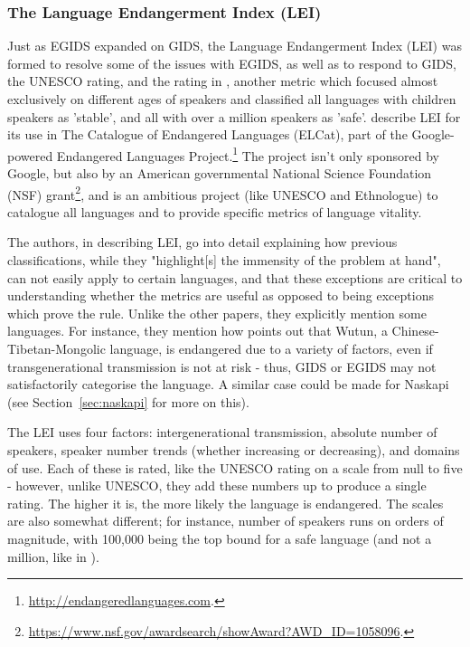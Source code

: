\subsubsection{The Language Endangerment Index (LEI)}

Just as EGIDS expanded on GIDS, the Language Endangerment Index (LEI) was formed to resolve some of the issues with EGIDS, as well as to respond to GIDS, the UNESCO rating, and the rating in \citet{krauss2007classification}, another metric which focused almost exclusively on different ages of speakers and classified all languages with children speakers as 'stable', and all with over a million speakers as 'safe'. \citet{lee2016assessing} describe LEI for its use in The Catalogue of Endangered Languages (ELCat), part of the Google-powered Endangered Languages Project.\footnote{\href{http://endangeredlanguages.com}{http://endangeredlanguages.com}. } The project isn't only sponsored by Google, but also by an American governmental National Science Foundation (NSF) grant\footnote{\href{https://www.nsf.gov/awardsearch/showAward?AWD\_ID=1058096}{https://www.nsf.gov/awardsearch/showAward?AWD\_ID=1058096}. }, and is an ambitious project (like UNESCO and Ethnologue) to catalogue all languages and to provide specific metrics of language vitality.

The authors, in describing LEI, go into detail explaining how previous classifications, while they "highlight[s] the immensity of the problem at hand", can not easily apply to certain languages, and that these exceptions are critical to understanding whether the metrics are useful as opposed to being exceptions which prove the rule. Unlike the other papers, they explicitly mention some languages. For instance, they mention how \citet{dwyer2012tools} points out that Wutun, a Chinese-Tibetan-Mongolic language, is endangered due to a variety of factors, even if transgenerational transmission is not at risk - thus, GIDS or EGIDS may not satisfactorily categorise the language. A similar case could be made for Naskapi (see Section~\ref{sec:naskapi} for more on this).

The LEI uses four factors: intergenerational transmission, absolute number of speakers, speaker number trends (whether increasing or decreasing), and domains of use. Each of these is rated, like the UNESCO rating on a scale from null to five - however, unlike UNESCO, they add these numbers up to produce a single rating. The higher it is, the more likely the language is endangered. The scales are also somewhat different; for instance, number of speakers runs on orders of magnitude, with 100,000 being the top bound for a safe language (and not a million, like in \citet{krauss2007classification}).

